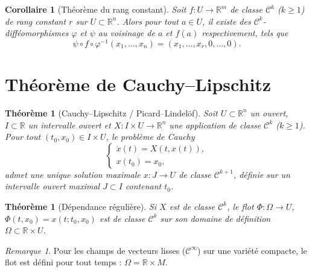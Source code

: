 \documentclass[12pt,a4paper,openany]{book}
\theoremstyle{definition}
\theoremstyle{plain}
\newtheorem{theoreme}[definition]{Théorème}
\newtheorem{corollaire}[definition]{Corollaire}
\theoremstyle{remark}
\newtheorem{remarque}[definition]{Remarque}
\newcommand{\R}{\mathbb{R}}
\begin{document}
\begin{corollaire}[Théorème du rang constant]\label{cor:app-rang}
Soit $f : U \to \R^m$ de classe $\mathcal{C}^k$ ($k \geqslant 1$) de rang
constant $r$ sur $U \subset \R^n$. Alors pour tout $a \in U$, il existe des
$\mathcal{C}^k$-difféomorphismes $\varphi$ et $\psi$ au voisinage de $a$ et
$f(a)$ respectivement, tels que
\[
  \psi \circ f \circ \varphi^{-1}(x_1, \ldots, x_n) = (x_1, \ldots, x_r, 0, \ldots, 0).
\]
\end{corollaire}

\section{Théorème de Cauchy--Lipschitz}\label{app:cauchy-lipschitz}

\begin{theoreme}[Cauchy--Lipschitz / Picard--Lindelöf]\label{thm:app-cauchy-lip}
Soit $U \subset \R^n$ un ouvert, $I \subset \R$ un intervalle ouvert et
$X : I \times U \to \R^n$ une application de classe $\mathcal{C}^k$
($k \geqslant 1$). Pour tout $(t_0, x_0) \in I \times U$, le problème de
Cauchy
\[
  \begin{cases}
    \dot{x}(t) = X(t, x(t)), \\
    x(t_0) = x_0,
  \end{cases}
\]
admet une unique solution maximale $x : J \to U$ de classe $\mathcal{C}^{k+1}$,
définie sur un intervalle ouvert maximal $J \subset I$ contenant $t_0$.
\end{theoreme}

\begin{theoreme}[Dépendance régulière]\label{thm:app-dependance}
Si $X$ est de classe $\mathcal{C}^k$, le flot
$\Phi : \Omega \to U$, $\Phi(t, x_0) = x(t; t_0, x_0)$ est de classe
$\mathcal{C}^k$ sur son domaine de définition $\Omega \subset \R \times U$.
\end{theoreme}

\begin{remarque}
Pour les champs de vecteurs lisses ($\mathcal{C}^\infty$) sur une variété
compacte, le flot est défini pour tout temps : $\Omega = \R \times M$.
\end{remarque}

\end{document}
